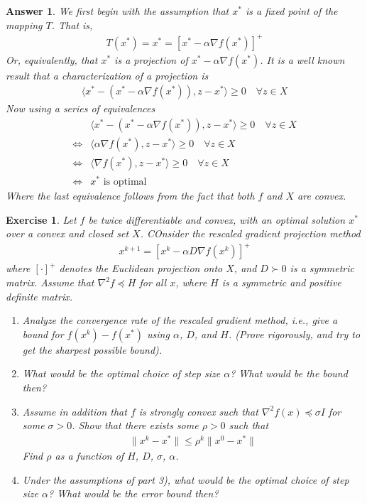 \documentclass[12pt]{article}
\theoremstyle{colon}
\newtheorem{exercise}{Exercise}
\newtheorem*{answer}{Answer}
\begin{document}
\begin{answer}
  We first begin with the assumption that $x^*$ is a fixed point of the mapping $T$. That is,
  \begin{gather*}
    T(x^*) = x^* = [x^* - \alpha \nabla f(x^*)]^+
  \end{gather*}
  Or, equivalently, that $x^*$ is a projection of $x^* - \alpha \nabla f(x^*)$. It is a well known result that a characterization of a projection is
  \begin{gather*}
    \langle x^* - (x^* - \alpha \nabla f(x^*)), z - x^* \rangle \geq 0 \quad \forall z \in X
  \end{gather*}
  Now using a series of equivalences
  \begin{align*}
    & \langle x^* - (x^* - \alpha \nabla f(x^*)), z - x^* \rangle \geq 0 \quad \forall z \in X \\
    \Longleftrightarrow & \langle \alpha \nabla f(x^*), z - x^* \rangle \geq 0 \quad \forall z \in X \\
    \Longleftrightarrow & \langle \nabla f(x^*), z - x^* \rangle \geq 0 \quad \forall z \in X \\
    \Longleftrightarrow & x^* \text{ is optimal}
  \end{align*}
  Where the last equivalence follows from the fact that both $f$ and $X$ are convex.
\end{answer}

\clearpage

\begin{exercise}
  Let $f$ be twice differentiable and convex, with an optimal solution $x^*$ over a convex and closed set $X$. COnsider the rescaled gradient projection method
  \begin{gather*}
    x^{k+1} = [x^k - \alpha D \nabla f(x^k)]^+
  \end{gather*}
  where $[\cdot]^+$ denotes the Euclidean projection onto $X$, and $D \succ 0$ is a symmetric matrix. Assume that $\nabla^2 f \preceq H$ for all $x$, where $H$ is a symmetric and positive definite matrix.
  \begin{enumerate}[label=\arabic*)]
    \item Analyze the convergence rate of the rescaled gradient method, i.e., give a bound for $f(x^k) - f(x^*)$ using $\alpha$, $D$, and $H$. (Prove rigorously, and try to get the sharpest possible bound).
    \item What would be the optimal choice of step size $\alpha$? What would be the bound then?
    \item Assume in addition that $f$ is strongly convex such that $\nabla^2 f(x) \preceq \sigma I$ for some $\sigma > 0$. Show that there exists some $\rho > 0$ such that
      \begin{gather*}
        \lVert x^k - x^* \rVert \leq \rho^k \lVert x^0 - x^* \rVert
      \end{gather*}
      Find $\rho$ as a function of $H$, $D$, $\sigma$, $\alpha$.
    \item Under the assumptions of part 3), what would be the optimal choice of step size $\alpha$? What would be the error bound then?
  \end{enumerate}
\end{exercise}
\end{document}
